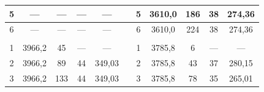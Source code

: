 \documentclass[11pt,a4paper,oneside]{article}
\begin{document}
\begin{enumerate}
\begin{center}
\begin{table}[h!]
\begin{tabular}{ccccccccccc}
\multicolumn{1}{|c|}{5}          & \multicolumn{1}{c|}{---}            & \multicolumn{1}{c|}{---}            & \multicolumn{1}{c|}{---}                     & \multicolumn{1}{c|}{---}             & \multicolumn{1}{c|}{}          & \multicolumn{1}{c|}{5}          & \multicolumn{1}{c|}{3610,0}         & \multicolumn{1}{c|}{186}            & \multicolumn{1}{c|}{38}                     & \multicolumn{1}{c|}{274,36}          \\ \hline
\multicolumn{1}{|c|}{6}          & \multicolumn{1}{c|}{---}            & \multicolumn{1}{c|}{---}            & \multicolumn{1}{c|}{---}                     & \multicolumn{1}{c|}{---}             & \multicolumn{1}{c|}{}          & \multicolumn{1}{c|}{6}          & \multicolumn{1}{c|}{3610,0}         & \multicolumn{1}{c|}{224}            & \multicolumn{1}{c|}{38}                     & \multicolumn{1}{c|}{274,36}          \\ \hline
\multicolumn{1}{|c|}{}           & \multicolumn{1}{c|}{}               & \multicolumn{1}{c|}{}               & \multicolumn{1}{c|}{}                        & \multicolumn{1}{c|}{}                & \multicolumn{1}{c|}{}          & \multicolumn{1}{c|}{}           & \multicolumn{1}{c|}{}               & \multicolumn{1}{c|}{}               & \multicolumn{1}{c|}{}                       & \multicolumn{1}{c|}{}                \\ \hline
\multicolumn{1}{|c|}{1}          & \multicolumn{1}{c|}{3966,2}         & \multicolumn{1}{c|}{45}             & \multicolumn{1}{c|}{---}                     & \multicolumn{1}{c|}{---}             & \multicolumn{1}{c|}{}          & \multicolumn{1}{c|}{1}          & \multicolumn{1}{c|}{3785,8}         & \multicolumn{1}{c|}{6}              & \multicolumn{1}{c|}{---}                    & \multicolumn{1}{c|}{---}             \\ \hline
\multicolumn{1}{|c|}{2}          & \multicolumn{1}{c|}{3966,2}         & \multicolumn{1}{c|}{89}             & \multicolumn{1}{c|}{44}                      & \multicolumn{1}{c|}{349,03}          & \multicolumn{1}{c|}{}          & \multicolumn{1}{c|}{2}          & \multicolumn{1}{c|}{3785,8}         & \multicolumn{1}{c|}{43}             & \multicolumn{1}{c|}{37}                     & \multicolumn{1}{c|}{280,15}          \\ \hline
\multicolumn{1}{|c|}{3}          & \multicolumn{1}{c|}{3966,2}         & \multicolumn{1}{c|}{133}            & \multicolumn{1}{c|}{44}                      & \multicolumn{1}{c|}{349,03}          & \multicolumn{1}{c|}{}          & \multicolumn{1}{c|}{3}          & \multicolumn{1}{c|}{3785,8}         & \multicolumn{1}{c|}{78}             & \multicolumn{1}{c|}{35}                     & \multicolumn{1}{c|}{265,01}          \\ \hline

\end{tabular}
\end{table}
\end{center}
\end{enumerate}
\end{document}
